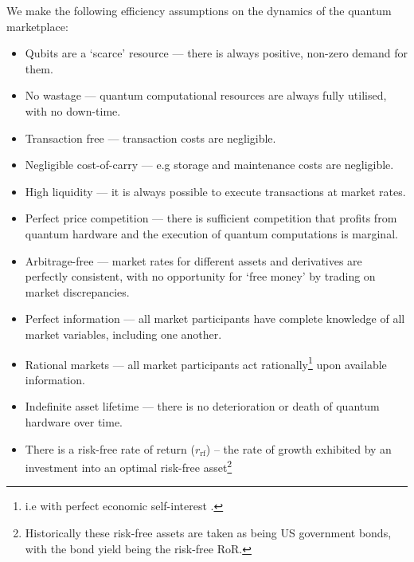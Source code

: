 \begin{postulate}\label{post:market_eff} We make the following efficiency assumptions on the dynamics of the quantum marketplace:
\begin{itemize}
	\item Qubits are a `scarce' resource --- there is always positive, non-zero demand for them.
	\item No wastage --- quantum computational resources are always fully utilised, with no down-time.
	\item Transaction free --- transaction costs are negligible.
	\item Negligible cost-of-carry --- e.g storage and maintenance costs are negligible.
	\item High liquidity --- it is always possible to execute transactions at market rates.
	\item Perfect price competition --- there is sufficient competition that profits from quantum hardware and the execution of quantum computations is marginal.
	\item Arbitrage-free --- market rates for different assets and derivatives are perfectly consistent, with no opportunity for `free money' by trading on market discrepancies.
	\item Perfect information --- all market participants have complete knowledge of all market variables, including one another.
	\item Rational markets --- all market participants act rationally\footnote{i.e with perfect economic self-interest .} upon available information.
	\item Indefinite asset lifetime --- there is no deterioration or death of quantum hardware over time.
	\item There is a risk-free rate of return ($r_\text{rf}$)
-- the rate of growth exhibited by an investment into an optimal risk-free asset\footnote{Historically these risk-free assets are taken as being US government bonds, with the bond yield being the risk-free RoR.}
	\end{itemize}
\end{postulate}

%
%

